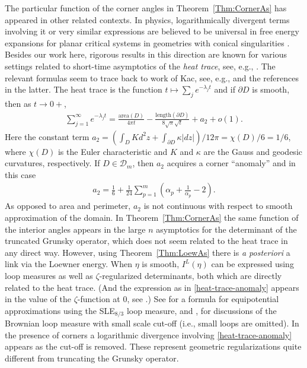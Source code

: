 \documentclass{article}
\numberwithin{equation}{section}
\numberwithin{figure}{section}
\theoremstyle{plain}
\theoremstyle{plain}
\numberwithin{thm}{section}
\theoremstyle{remark}
\begin{document}
The particular function of the corner angles in Theorem~\ref{Thm:CornerAs} has appeared in other related contexts. In physics, logarithmically divergent terms involving it or very similar expressions are believed to be universal in free energy expansions for planar critical systems in geometries with conical singularities \cite{AS, CardyPeschel, Laskin}. Besides our work here, rigorous results in this direction are known for various settings related to short-time asymptotics of the \emph{heat trace}, see, e.g., \cite{Kenyon, IK, PW}. The relevant formulas seem to trace back to work of Kac, see, e.g., \cite{Kac, vdB, Cheeger, MR} and the references in the latter. The heat trace is the function $t \mapsto \sum_{j} e^{-\lambda_j t}$ and if $\partial D$ is smooth, then as $t \to 0+$, 
\begin{align}\label{heat-trace}
\sum_{j=1}^\infty e^{-\lambda_j t} = \frac{\textrm{area}(D)}{4 \pi t} - \frac{\textrm{length}(\partial D)}{8 \sqrt{\pi} \sqrt{t}} + a_2 + o(1).
\end{align}
Here the constant term $a_2=(\int_D K d^2z + \int_{\partial D} \kappa |dz|)/12\pi = \chi(D)/6=1/6$, where $\chi(D)$ is the Euler characteristic and $K$ and $\kappa$ are the Gauss and geodesic curvatures, respectively. If $D \in  \mathcal{D}_m$, then $a_2$ acquires a corner ``anomaly'' and in this case \begin{align}\label{heat-trace-anomaly} a_2 = \frac{1}{6} + \frac{1}{24}\sum_{p=1}^m
\left(\alpha_p + \frac{1}{\alpha_p} -2\right).\end{align}
As opposed to area and perimeter, $a_2$ is not continuous with respect to smooth approximation of the domain. In Theorem~\ref{Thm:CornerAs} the same function of the interior angles appears in the large $n$ asymptotics for the determinant of the truncated Grunsky operator, which does not seem related to the heat trace in any direct way. However, using Theorem~\ref{Thm:LoewAs} there is \emph{a posteriori} a link via the Loewner energy. When $\eta$ is smooth, $I^L(\eta)$ can be expressed using loop measures as well as $\zeta$-regularized determinants, both which are directly related to the heat trace. (And the expression as in \eqref{heat-trace-anomaly} appears in the value of the $\zeta$-function at $0$, see \cite[Theorem~4.4]{Cheeger}.) See \cite[Theorem~4.1]{WaLoop} for a formula for equipotential approximations using the SLE$_{8/3}$ loop measure, and \cite{APPS}, \cite[Section~6.3]{PW} for discussions of the Brownian loop measure  with small scale cut-off (i.e., small loops are omitted). In the presence of corners a logarithmic divergence involving \eqref{heat-trace-anomaly} appears as the cut-off is removed. These represent geometric regularizations quite different from truncating the Grunsky operator.
\end{document}
